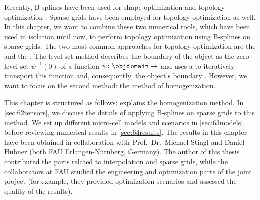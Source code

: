 Recently, B-splines have been used for
shape optimization \cite{Martin16Formoptimierung} and
topology optimization .
Sparse grids have been employed for
topology optimization \cite{Huebner14Mehrdimensionale} as well.
In this chapter, we want to combine these two numerical tools,
which have been used in isolation until now,
to perform topology optimization using B-splines on sparse grids.
The two most common approaches for topology optimization are
the  and
the  \cite{Allaire16Towards}.
The level-set method describes the boundary of the object
as the zero level set $\psi^{-1}(0)$ of a function
$\psi\colon \objdomain \to \real$ 
and uses a \pde to iteratively transport this function and,
consequently, the object's boundary \cite{Allaire04Topology}.
However, we want to focus on the second method:
the method of homogenization.

This chapter is structured as follows:
 explains the homogenization method.
In \cref{sec:62tensors}, we discuss the details of applying B-splines on
sparse grids to this method.
We set up different micro-cell models and scenarios in \cref{sec:63models},
before reviewing numerical results in \cref{sec:64results}.
The results in this chapter have been obtained in collaboration with
Prof.\ Dr.\ Michael Stingl and Daniel Hübner
(both FAU Erlangen-Nürnberg, Germany).
The author of this thesis contributed the parts related to
interpolation and sparse grids, while the collaborators at FAU
studied the engineering and optimization parts of the joint project
(for example, they provided optimization scenarios and
assessed the quality of the results).






\cleardoublepage
